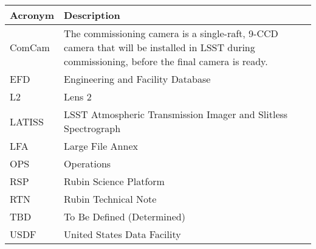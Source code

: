 \addtocounter{table}{-1}
\begin{longtable}{p{}p{}}\hline
\textbf{Acronym} & \textbf{Description}  \\\hline

ComCam & The commissioning camera is a single-raft, 9-CCD camera that will be installed in LSST during commissioning, before the final camera is ready. \\\hline
EFD & Engineering and Facility Database \\\hline
L2 & Lens 2 \\\hline
LATISS & LSST Atmospheric Transmission Imager and Slitless Spectrograph \\\hline
LFA & Large File Annex \\\hline
OPS & Operations \\\hline
RSP & Rubin Science Platform \\\hline
RTN & Rubin Technical Note \\\hline
TBD & To Be Defined (Determined) \\\hline
USDF & United States Data Facility \\\hline
\end{longtable}
